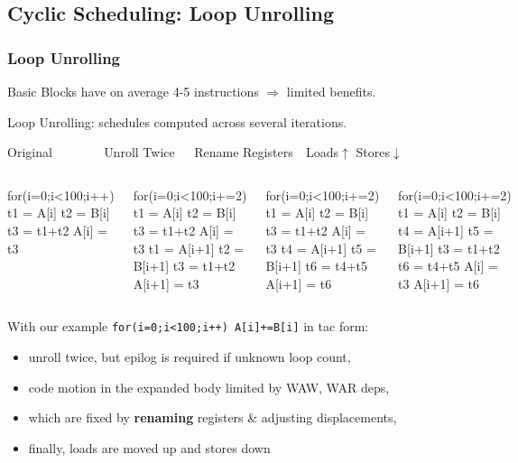 \documentclass{beamer}
\renewcommand{\emph}[1]{\textcolor{structure}{#1}}
\newcommand{\emp}[1]{\textcolor{DikuRed}{ #1}}
\begin{document}
\subsection{Cyclic Scheduling: Loop Unrolling}
\begin{frame}[fragile,t]
    \frametitle{Loop Unrolling}

Basic Blocks have on average 4-5 instructions $\Rightarrow$ limited benefits.
\smallskip

Loop Unrolling: schedules computed across several iterations.

\begin{block}{Original{\tt~~~~~~~~}Unroll Twice{\tt~~~}Rename Registers{\tt~~}Loads$\uparrow$ Stores$\downarrow$}\vspace{-2ex}
\begin{columns}
\begin{colorcode}[fontsize=\scriptsize]
for(i=0;i<100;i++)
  t1 = A[i]
  t2 = B[i]
  t3 = t1+t2
  A[i] = t3
\end{colorcode} 
\begin{colorcode}[fontsize=\scriptsize]
for(i=0;i<100;i+=2)
  t1 = A[i]
  t2 = B[i]
  t3 = t1+t2
  A[i] = t3
  \emp{t1 = A[i+1]}
  \emp{t2 = B[i+1]}
  \emp{t3 = t1+t2}
  \emp{A[i+1] = t3}
\end{colorcode} 
\begin{colorcode}[fontsize=\scriptsize]
for(i=0;i<100;i+=2)
  t1 = A[i]
  t2 = B[i]
  t3 = t1+t2
  A[i] = t3
  \emph{t4} = A[i+1]
  \emph{t5} = B[i+1]
  \emph{t6} = t4+t5
  A[i+1] = \emph{t6}
\end{colorcode} 
\begin{colorcode}[fontsize=\scriptsize]
for(i=0;i<100;i+=2)
  t1 = \emph{A[i]}
  t2 = \emph{B[i]}
  t4 = \emph{A[i+1]}
  t5 = \emph{B[i+1]}
  t3 = t1+t2
  t6 = t4+t5
  \emp{A[i]} = t3
  \emp{A[i+1]} = t6
\end{colorcode} 
\end{columns}
\end{block}
\smallskip \pause

With our example {\tt for(i=0;i<100;i++) A[i]+=B[i]} in {\sc tac} form:
\begin{itemize}
    \item unroll twice, but epilog is required if unknown loop count,
    \item code motion in the expanded body limited by WAW, WAR deps,
    \item which are fixed by {\bf \emph{renaming}} registers \& adjusting displacements,
    \item finally, loads are moved up and stores down
\end{itemize}

\end{frame}
\end{document}

